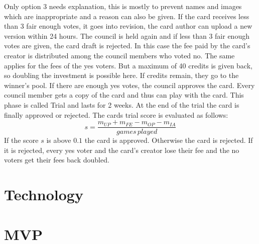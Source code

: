 \documentclass{article}
\begin{document}
%
Only option 3 needs explanation, this is mostly to prevent names and images which are inappropriate and a reason can also be given. If the card receives less than 3 fair enough votes, it goes into revision, the card author can upload a new version within 24 hours. The council is held again and if less than 3 fair enough votes are given, the card draft is rejected. In this case the fee paid by the card's creator is distributed among the council members who voted no. The same applies for the fees of the yes voters. But a maximum of 40 credits is given back, so doubling the investment is possible here. If credits remain, they go to the winner's pool. If there are enough yes votes, the council approves the card. Every council member gets a copy of the card and thus can play with the card. This phase is called Trial and lasts for 2 weeks. At the end of the trial the card is finally approved or rejected. The cards trial score is evaluated as follows:
%
\begin{equation}%
s = \frac{m_{UP} +  m_{FE} - m_{OP} - m_{IA}}{games \, played}
\end{equation}
%
If the score $s$ is above $0.1$ the card is approved. Otherwise the card is rejected. If it is rejected, every yes voter and the card's creator lose their fee and the no voters get their fees back doubled.
%
\section{Technology}
%
\section{MVP}
%
\end{document}

